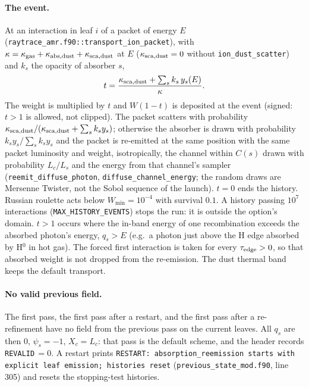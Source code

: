 \documentclass[english,a4paper]{my_memo}
\newcommand{\code}[1]{\texttt{#1}}
\begin{document}
\paragraph{The event.}  At an interaction in leaf $i$ of a packet of energy
$E$ (\code{raytrace\_amr.f90::transport\_ion\_packet}), with
$\kappa=\kappa_{\rm gas}+\kappa_{\rm abs,dust}+\kappa_{\rm sca,dust}$ at $E$
($\kappa_{\rm sca,dust}=0$ without \code{ion\_dust\_scatter}) and $k_s$ the
opacity of absorber $s$,
\begin{equation}
 t = \frac{\kappa_{\rm sca,dust}+\sum_s k_s\,y_s(E)}{\kappa}.
 \label{eq:reem-t}
\end{equation}
The weight is multiplied by $t$ and $W(1-t)$ is deposited at the event
(signed: $t>1$ is allowed, not clipped).  The packet scatters with
probability $\kappa_{\rm sca,dust}/(\kappa_{\rm sca,dust}+\sum_s k_sy_s)$;
otherwise the absorber is drawn with probability $k_sy_s/\sum_s k_sy_s$ and
the packet is re-emitted at the same position with the same packet luminosity
and weight, isotropically, the channel within $C(s)$ drawn with probability
$L_c/L_s$ and the energy from that channel's sampler
(\code{reemit\_diffuse\_photon}, \code{diffuse\_channel\_energy}; the
random draws are Mersenne Twister, not the Sobol sequence of the launch).
$t=0$ ends the history.  Russian roulette acts below $W_{\min}=10^{-4}$ with
survival $0.1$.  A history passing $10^7$ interactions
(\code{MAX\_HISTORY\_EVENTS}) stops the run: it is outside the option's
domain.  $t>1$ occurs where the in-band energy of one recombination exceeds
the absorbed photon's energy, $q_s > E$ (e.g.\ a photon just above the H edge
absorbed by H$^0$ in hot gas).  The forced first interaction is taken for
every $\tau_{\rm edge}>0$, so that absorbed weight is not dropped from the
re-emission.  The dust thermal band keeps the default transport.

\paragraph{No valid previous field.}  The first pass, the first pass after a
restart, and the first pass after a re-refinement have no field from the
previous pass on the current leaves.  All $q_s$ are then 0, $\psi_s=-1$,
$X_c=L_c$: that pass is the default scheme, and the header records
\code{REVALID}\,$=0$.  A restart prints
\code{RESTART: absorption\_reemission starts with explicit leaf emission;
histories reset} (\code{previous\_state\_mod.f90}, line 305) and resets the
stopping-test histories.
\end{document}
